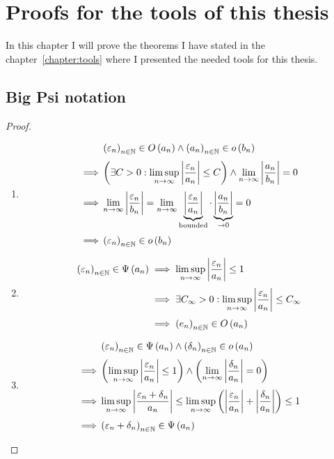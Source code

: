 \chapter{Proofs for the tools of this thesis}

In this chapter I will prove the theorems I have stated in the chapter~\ref{chapter:tools} where I presented the needed tools for this thesis.

\section{Big Psi notation}



\begin{proof} ~
  \begin{enumerate}
    \item

      \begin{align}
        & \seq{\epsilon_n}\in\bigo{a_n} \land \seq{a_n} \in \littleo{b_n} \nl
        \implies & \left(\exists C > 0: \limsup_{n\to\infty} \abs{\frac{\epsilon_n}{a_n}} \le C\right) \land \lim_{n\to\infty} \abs{\frac{a_n}{b_n}} = 0 \nl
        \implies & \lim_{n\to\infty} \abs{\frac{\epsilon_n}{b_n}} = \lim_{n\to\infty} \underbrace{\abs{\frac{\epsilon_n}{a_n}}}_{\text{bounded}} \cdot \underbrace{\abs{\frac{a_n}{b_n}}}_{\to 0} = 0 \nl
        \implies & \seq{\epsilon_n} \in \littleo{b_n}
      \end{align}
    \item

      \begin{align}
        \seq{\epsilon_n} \in \bigpsi{a_n} & \implies \limsup_{n\to\infty} \abs{\frac{\epsilon_n}{a_n}} \le 1 \nl
                                          & \implies \exists C_\infty > 0 : \limsup_{n\to\infty} \abs{\frac{\epsilon_n}{a_n}} \le C_\infty \nl
                                          & \implies \seq{e_n} \in \bigo{a_n}
      \end{align}

    \item

      \begin{align}
        & \seq{\epsilon_n} \in \bigpsi{a_n} \land \seq{\delta_n} \in \littleo{a_n} \nl
        \implies& \left(\limsup_{n\to\infty} \abs{\frac{\epsilon_n}{a_n}} \le 1\right) \land \left(\lim_{n\to\infty} \abs{\frac{\delta_n}{a_n}} = 0\right) \nl
        \implies& \limsup_{n\to\infty} \abs{\frac{\epsilon_n+\delta_n}{a_n}} \le \limsup_{n\to\infty} \left(\abs{\frac{\epsilon_n}{a_n}}+\abs{\frac{\delta_n}{a_n}}\right) \le 1 \nl
        \implies& \seq{\epsilon_n+\delta_n} \in \bigpsi{a_n}
      \end{align}
  \end{enumerate}
\end{proof}

